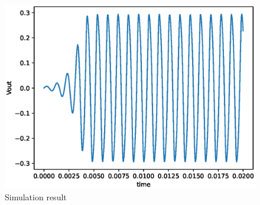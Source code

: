 \begin{enumerate}[label=\arabic*.,ref=\theenumi]
\begin{figure}[!ht]
\centering
\includegraphics[width=\columnwidth]{./figs/ee18btech11049/ee18btech11049_2.eps}
\caption{Simulation result}
\label{fig:ee18btech11049_final}
\end{figure}

\end{enumerate}
